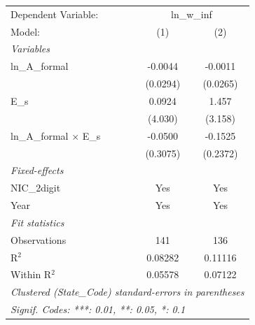 
\begingroup
\centering
\begin{tabular}{lcc}
   \tabularnewline \midrule \midrule
   Dependent Variable: & \multicolumn{2}{c}{ln\_w\_inf}\\
   Model:                          & (1)      & (2)\\  
   \midrule
   \emph{Variables}\\
   ln\_A\_formal                   & -0.0044  & -0.0011\\   
                                   & (0.0294) & (0.0265)\\   
   E\_s                            & 0.0924   & 1.457\\   
                                   & (4.030)  & (3.158)\\   
   ln\_A\_formal $\times$ E\_s     & -0.0500  & -0.1525\\   
                                   & (0.3075) & (0.2372)\\   
   \midrule
   \emph{Fixed-effects}\\
   NIC\_2digit                     & Yes      & Yes\\  
   Year                            & Yes      & Yes\\  
   \midrule
   \emph{Fit statistics}\\
   Observations                    & 141      & 136\\  
   R$^2$                           & 0.08282  & 0.11116\\  
   Within R$^2$                    & 0.05578  & 0.07122\\  
   \midrule \midrule
   \multicolumn{3}{l}{\emph{Clustered (State\_Code) standard-errors in parentheses}}\\
   \multicolumn{3}{l}{\emph{Signif. Codes: ***: 0.01, **: 0.05, *: 0.1}}\\
\end{tabular}
\par\endgroup



